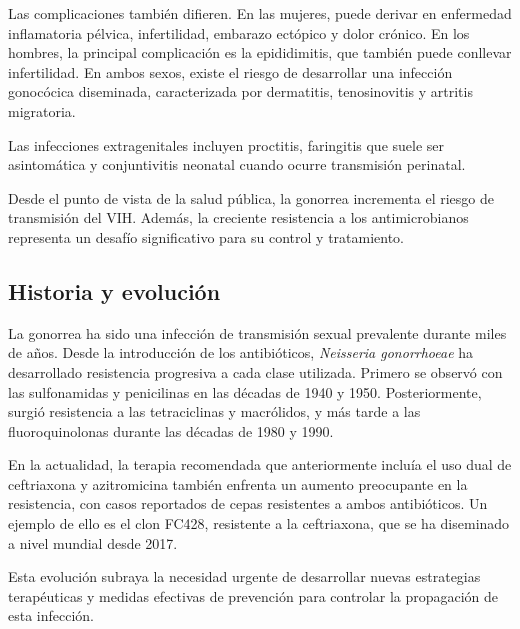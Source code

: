 Las complicaciones también difieren. En las mujeres, puede derivar en enfermedad inflamatoria pélvica, infertilidad, embarazo ectópico y dolor crónico. En los hombres, la principal complicación es la epididimitis, que también puede conllevar infertilidad. En ambos sexos, existe el riesgo de desarrollar una infección gonocócica diseminada, caracterizada por dermatitis, tenosinovitis y artritis migratoria.

Las infecciones extragenitales incluyen proctitis, faringitis que suele ser asintomática y conjuntivitis neonatal cuando ocurre transmisión perinatal.

Desde el punto de vista de la salud pública, la gonorrea incrementa el riesgo de transmisión del VIH. Además, la creciente resistencia a los antimicrobianos representa un desafío significativo para su control y tratamiento.

\subsection{Historia y evolución}
La gonorrea ha sido una infección de transmisión sexual prevalente durante miles de años. Desde la introducción de los antibióticos, \textit{Neisseria gonorrhoeae} ha desarrollado resistencia progresiva a cada clase utilizada. Primero se observó con las sulfonamidas y penicilinas en las décadas de 1940 y 1950. Posteriormente, surgió resistencia a las tetraciclinas y macrólidos, y más tarde a las fluoroquinolonas durante las décadas de 1980 y 1990.

En la actualidad, la terapia recomendada que anteriormente incluía el uso dual de ceftriaxona y azitromicina también enfrenta un aumento preocupante en la resistencia, con casos reportados de cepas resistentes a ambos antibióticos. Un ejemplo de ello es el clon FC428, resistente a la ceftriaxona, que se ha diseminado a nivel mundial desde 2017.

Esta evolución subraya la necesidad urgente de desarrollar nuevas estrategias terapéuticas y medidas efectivas de prevención para controlar la propagación de esta infección.







